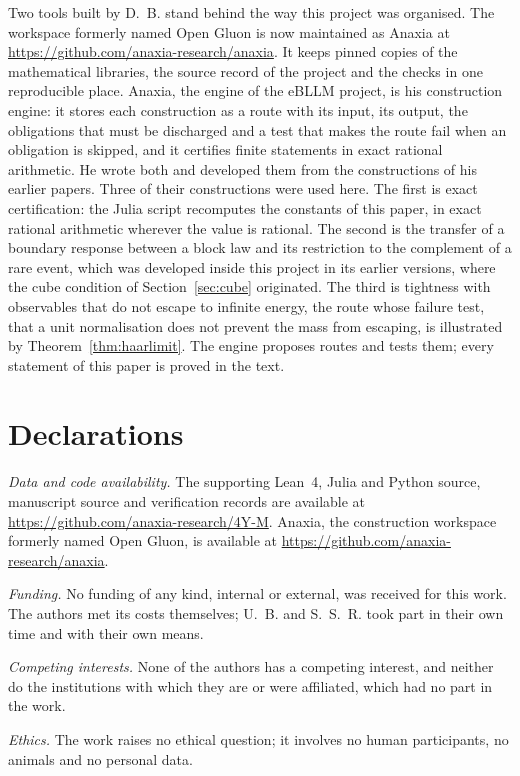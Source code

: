 Two tools built by D.~B. stand behind the way this project was organised.
The workspace formerly named Open Gluon is now maintained as Anaxia at
\url{https://github.com/anaxia-research/anaxia}. It keeps pinned
copies of the mathematical libraries, the source record of the project and
the checks in one reproducible place. Anaxia, the engine of the eBLLM
project, is his construction engine: it stores each construction as a route
with its input, its output, the obligations that must be discharged and a
test that makes the route fail when an obligation is skipped, and it
certifies finite statements in exact rational arithmetic. He wrote both and
developed them from the constructions of his earlier papers. Three of their
constructions were used here. The first is exact certification: the Julia script recomputes the
constants of this paper, in exact rational arithmetic wherever the value is
rational. The second is the transfer of a boundary response
between a block law and its restriction to the complement of a rare event,
which was developed inside this project in its earlier versions, where the
cube condition of Section~\ref{sec:cube} originated. The third is tightness with observables that do not
escape to infinite energy, the route whose failure test, that a unit
normalisation does not prevent the mass from escaping, is illustrated by
Theorem~\ref{thm:haarlimit}. The engine proposes routes and tests them;
every statement of this paper is proved in the text.

\section*{Declarations}

\emph{Data and code availability.} The supporting Lean~4, Julia and Python
source, manuscript source and verification records are available at
\url{https://github.com/anaxia-research/4Y-M}.
Anaxia, the construction workspace formerly named Open Gluon, is available at
\url{https://github.com/anaxia-research/anaxia}.

\emph{Funding.} No funding of any kind, internal or external, was received
for this work. The authors met its costs themselves; U.~B. and S.~S.~R. took
part in their own time and with their own means.

\emph{Competing interests.} None of the authors has a competing interest,
and neither do the institutions with which they are or were affiliated,
which had no part in the work.

\emph{Ethics.} The work raises no ethical question; it involves no human
participants, no animals and no personal data.
